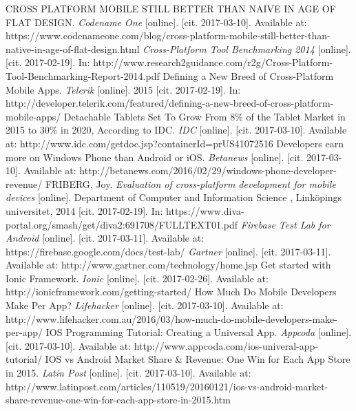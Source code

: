 \documentclass[english,master,public,dept460,male,cpdeclaration,oneside]{diploma}
\begin{document}
\begin{thebibliography}{99}
	 CROSS PLATFORM MOBILE STILL BETTER THAN NAIVE IN AGE OF FLAT DESIGN. \textit{Codename One} [online]. [cit. 2017-03-10]. Available at: https://www.codenameone.com/blog/cross-platform-mobile-still-better-than-native-in-age-of-flat-design.html
	 \textit{Cross-Platform Tool Benchmarking 2014} [online]. [cit. 2017-02-19]. In: http://www.research2guidance.com/r2g/Cross-Platform-Tool-Benchmarking-Report-2014.pdf
	 Defining a New Breed of Cross-Platform Mobile Apps. \textit{Telerik} [online]. 2015 [cit. 2017-02-19]. In: http://developer.telerik.com/featured/defining-a-new-breed-of-cross-platform-mobile-apps/
	 Detachable Tablets Set To Grow From 8\% of the Tablet Market in 2015 to 30\% in 2020, According to IDC. \textit{IDC} [online]. [cit. 2017-03-10]. Available at: http://www.idc.com/getdoc.jsp?containerId=prUS41072516
	 Developers earn more on Windows Phone than Android or iOS. \textit{Betanews} [online]. [cit. 2017-03-10]. Available at: http://betanews.com/2016/02/29/windows-phone-developer-revenue/
	 FRIBERG, Joy. \textit{Evaluation of cross-platform development for mobile devices} [online]. Department of Computer and Information Science , Linköpings universitet, 2014 [cit. 2017-02-19]. In: https://www.diva-portal.org/smash/get/diva2:691708/FULLTEXT01.pdf	
	 \textit{Firebase Test Lab for Android} [online]. [cit. 2017-03-11]. Available at: https://firebase.google.com/docs/test-lab/	
	 \textit{Gartner} [online]. [cit. 2017-03-11]. Available at: http://www.gartner.com/technology/home.jsp
	 Get started with Ionic Framework. \textit{Ionic} [online]. [cit. 2017-02-26]. Available at: http://ionicframework.com/getting-started/
	 How Much Do Mobile Developers Make Per App? \textit{Lifehacker} [online]. [cit. 2017-03-10]. Available at: http://www.lifehacker.com.au/2016/03/how-much-do-mobile-developers-make-per-app/
	 IOS Programming Tutorial: Creating a Universal App. \textit{Appcoda} [online]. [cit. 2017-03-10]. Available at: http://www.appcoda.com/ios-univeral-app-tutorial/
	 IOS vs Android Market Share \& Revenue: One Win for Each App Store in 2015. \textit{Latin Post} [online]. [cit. 2017-03-10]. Available at: http://www.latinpost.com/articles/110519/20160121/ios-vs-android-market-share-revenue-one-win-for-each-app-store-in-2015.htm

\end{thebibliography}
\end{document}
